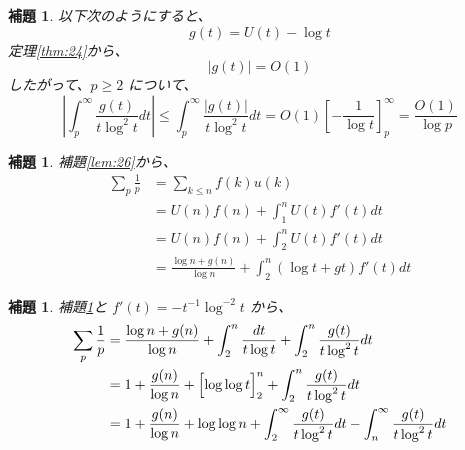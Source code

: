 \documentclass[12pt, a4j]{ltjsarticle}
\newtheorem{lem}[thm]{補題}
\begin{document}
\vspace{1cm}

\begin{lem}\label{lem:28}
以下次のようにすると、
\begin{equation}
g(t) = U(t) - \log t
\end{equation}
定理\ref{thm:24}から、
\begin{equation}\label{eq:59}
|g(t)| = O(1)
\end{equation}
したがって、$p\ge2$ について、
\begin{equation}\label{eq:60}
\left|\int_p^\infty\frac{g(t)}{t\log^2 t}dt\right|
\le \int_p^\infty\frac{|g(t)|}{t\log^2 t}dt
= O(1)\left[-\frac{1}{\log t}\right]_p^\infty = \frac{O(1)}{\log p}　
\end{equation}
\end{lem}

\vspace{1cm}

\begin{lem}\label{lem:29}
補題\ref{lem:26}から、
\begin{align}
\sum_p \frac{1}{p} &= \sum_{k\le n} f(k)u(k) \\
                   &= U(n)f(n) + \int_1^n U(t)f'(t)dt \\
                   &= U(n)f(n) + \int_2^n U(t)f'(t)dt \\
                   &= \frac{\log n + g(n)}{\log n} + \int_2^n (\log t + gt)f'(t) dt
\end{align}
\end{lem}

\vspace{1cm}

\begin{lem}\label{lem:30}
補題\ref{lem:29}と $f'(t)=-t^{-1}\log^{-2}t$ から、
\begin{align}
\sum_p \frac{1}{p} &= \frac{\log n + g(n)}{\log n} + \int_2^n \frac{dt}{t \log t} + \int_2^n \frac{g(t)}{t \log^2 t} dt \\
                   &= 1 + \frac{g(n)}{\log n} + \Bigl[\log\log t\Bigr]^n_2 + \int_2^n \frac{g(t)}{t \log^2 t} dt \\
                   &= 1 + \frac{g(n)}{\log n} + \log\log n + \int_2^\infty \frac{g(t)}{t \log^2 t} dt - \int_n^\infty \frac{g(t)}{t \log^2 t} dt
\end{align}
\end{lem}


\vspace{1cm}
\end{document}

